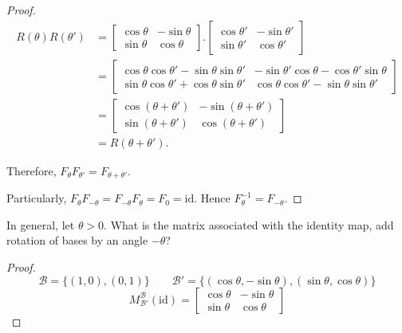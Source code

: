 \begin{proof}
    \begin{align*}
        R(\theta)R(\theta') & =
        \begin{bmatrix}
            \cos\theta & -\sin\theta \\
            \sin\theta & \cos\theta
        \end{bmatrix}.
        \begin{bmatrix}
            \cos\theta' & -\sin\theta' \\
            \sin\theta' & \cos\theta'
        \end{bmatrix}                                                                                             \\
                            & = \begin{bmatrix}
                                    \cos\theta\cos\theta' - \sin\theta\sin\theta' & -\sin\theta'\cos\theta - \cos\theta'\sin\theta \\
                                    \sin\theta\cos\theta' + \cos\theta\sin\theta' & \cos\theta\cos\theta' - \sin\theta\sin\theta'
                                \end{bmatrix} \\
                            & = \begin{bmatrix}
                                    \cos(\theta + \theta') & -\sin(\theta + \theta') \\
                                    \sin(\theta + \theta') & \cos(\theta + \theta')
                                \end{bmatrix}                                               \\
                            & = R(\theta + \theta').
    \end{align*}

    Therefore, $F_{\theta}F_{\theta'} = F_{\theta + \theta'}$.

    Particularly, $F_{\theta}F_{-\theta} = F_{-\theta}F_{\theta} = F_{0} = \text{id}$. Hence $F_{\theta}^{-1} = F_{-\theta}$.
\end{proof}

\begin{exercise}
    In general, let $\theta > 0$. What is the matrix associated with the identity map, add rotation of bases by an angle $-\theta$?
\end{exercise}

\begin{proof}
    \[
        \mathscr{B} = \{ (1, 0), (0, 1) \} \qquad \mathscr{B'} = \{ (\cos\theta, -\sin\theta), (\sin\theta, \cos\theta) \}
    \]
    \[
        M^{\mathscr{B}}_{\mathscr{B'}}(\text{id}) =
        \begin{bmatrix}
            \cos\theta & -\sin\theta \\
            \sin\theta & \cos\theta
        \end{bmatrix}
    \]
\end{proof}

